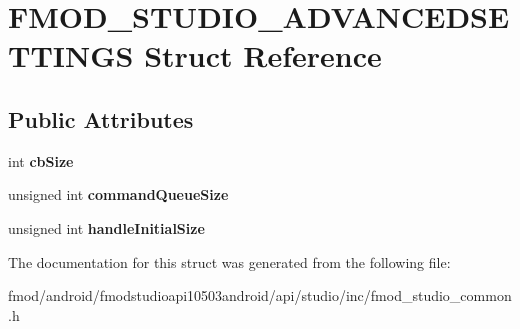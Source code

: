 \hypertarget{struct_f_m_o_d___s_t_u_d_i_o___a_d_v_a_n_c_e_d_s_e_t_t_i_n_g_s}{\section{F\+M\+O\+D\+\_\+\+S\+T\+U\+D\+I\+O\+\_\+\+A\+D\+V\+A\+N\+C\+E\+D\+S\+E\+T\+T\+I\+N\+G\+S Struct Reference}
\label{struct_f_m_o_d___s_t_u_d_i_o___a_d_v_a_n_c_e_d_s_e_t_t_i_n_g_s}
}
\subsection*{Public Attributes}
\begin{DoxyCompactItemize}
\item 
\hypertarget{struct_f_m_o_d___s_t_u_d_i_o___a_d_v_a_n_c_e_d_s_e_t_t_i_n_g_s_acb7eb7475c3120617f49ee0822b24a7d}{int {\bfseries cb\+Size}}\label{struct_f_m_o_d___s_t_u_d_i_o___a_d_v_a_n_c_e_d_s_e_t_t_i_n_g_s_acb7eb7475c3120617f49ee0822b24a7d}

\item 
\hypertarget{struct_f_m_o_d___s_t_u_d_i_o___a_d_v_a_n_c_e_d_s_e_t_t_i_n_g_s_ac76b4cb926c94154850f206b486a77c9}{unsigned int {\bfseries command\+Queue\+Size}}\label{struct_f_m_o_d___s_t_u_d_i_o___a_d_v_a_n_c_e_d_s_e_t_t_i_n_g_s_ac76b4cb926c94154850f206b486a77c9}

\item 
\hypertarget{struct_f_m_o_d___s_t_u_d_i_o___a_d_v_a_n_c_e_d_s_e_t_t_i_n_g_s_a111b38682bc9a8722935e3a8c48fdb44}{unsigned int {\bfseries handle\+Initial\+Size}}\label{struct_f_m_o_d___s_t_u_d_i_o___a_d_v_a_n_c_e_d_s_e_t_t_i_n_g_s_a111b38682bc9a8722935e3a8c48fdb44}

\end{DoxyCompactItemize}


The documentation for this struct was generated from the following file\+:\begin{DoxyCompactItemize}
\item 
fmod/android/fmodstudioapi10503android/api/studio/inc/fmod\+\_\+studio\+\_\+common.\+h\end{DoxyCompactItemize}
